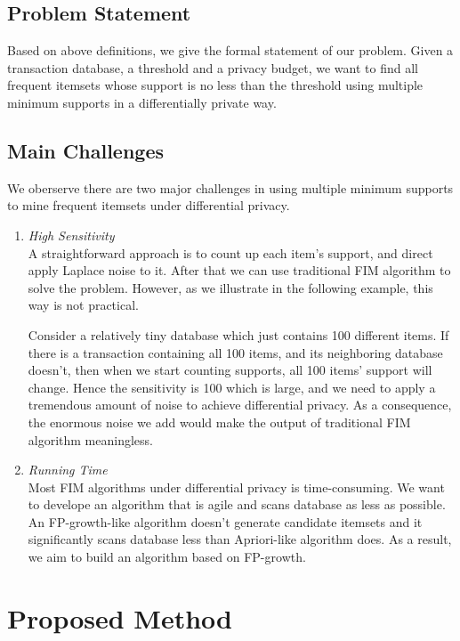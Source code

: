 \documentclass[conference]{IEEEtran}
\begin{document}
\subsection{Problem Statement}
Based on above definitions, we give the formal statement of our problem. 
Given a transaction database, a threshold and a privacy budget, we want to find all frequent itemsets whose support is no less than the threshold using multiple minimum supports in a differentially private way.
\subsection{Main Challenges}
We oberserve there are two major challenges in using multiple minimum supports to mine frequent itemsets under differential privacy.
\begin{enumerate}
    \item {\it High Sensitivity}\\
    A straightforward approach is to count up each item's support, and direct apply Laplace noise to it. After that we can use traditional FIM algorithm to solve the problem.
    However, as we illustrate in the following example, this way is not practical.
    \begin{example}
        Consider a relatively tiny database which just contains 100 different items.
        If there is a transaction containing all 100 items, and its neighboring database doesn't, then when we start counting supports, all 100 items' support will change.
        Hence the sensitivity is 100 which is large, and we need to apply a tremendous amount of noise to achieve differential privacy. 
        As a consequence, the enormous noise we add would make the output of traditional FIM algorithm meaningless.
    \end{example}
    
    \item {\it Running Time}\\
    Most FIM algorithms under differential privacy is time-consuming. 
    We want to develope an algorithm that is agile and scans database as less as possible.
    An FP-growth-like algorithm doesn't generate candidate itemsets and it significantly scans database less than Apriori-like algorithm does.
    As a result, we aim to build an algorithm based on FP-growth.
    
\end{enumerate} 


\section{Proposed Method}\label{sec4}
\end{document}
